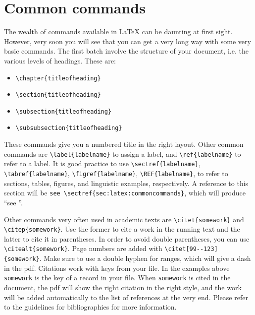\section{Common commands}\label{sec:latex:commoncommands}
The wealth of commands available in \LaTeX\xspace can be daunting at first sight. However, very soon you will see that you can get a very long way with some very basic commands. The first batch involve the structure of your document, i.e. the various levels of headings. These are:
\begin{itemize}
\item \verb+\chapter{titleofheading}+
\item \verb+\section{titleofheading}+
\item \verb+\subsection{titleofheading}+
\item \verb+\subsubsection{titleofheading}+
\end{itemize}

These commands give you a numbered title in the right layout.
Other common commands are 
\verb+\label{labelname}+ 
to assign a label, and 
\verb+\ref{labelname}+
to refer to a label. It is good practice to use 
\verb+\sectref{labelname}+,
\verb+\tabref{labelname}+,
\verb+\figref{labelname}+,
\verb+\REF{labelname}+,
to refer to sections, tables, figures, and linguistic examples, respectively. A reference to this section will be \verb+see \sectref{sec:latex:commoncommands}+, which will produce ``see ''.

Other commands very often used in academic texts are \verb+\citet{somework}+ and \verb+\citep{somework}+. Use the former to cite a work in the running text and the latter to cite it in parentheses. In order to avoid double parentheses, you can use  \verb+\citealt{somework}+. Page numbers are added with \verb+\citet[99--123]{somework}+. Make sure to use a double hyphen for ranges, which will give a dash in the pdf. Citations work with keys from your \bibtex file. In the examples above \verb+somework+ is the key of a record in your \bibtex file. When \verb+somework+ is cited in the document, the pdf will show the right citation in the right style, and the work will be added automatically to the list of references at the very end. Please refer to the guidelines for bibliographies for more information.



